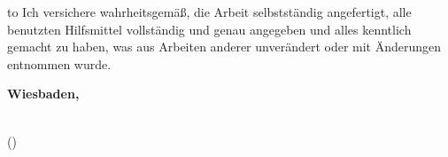 
\thispagestyle{empty}
\null\vfill
\noindent\hbox to \textwidth{\hrulefill} 
%
{Ich versichere wahrheitsgemäß, die Arbeit
selbstständig angefertigt, alle benutzten Hilfsmittel vollständig und genau
angegeben und alles kenntlich gemacht zu haben, was aus Arbeiten anderer
unverändert oder mit Änderungen entnommen wurde.}
 
 

\textbf{Wiesbaden, }
\vspace{1.5cm}
 
\dotfill\hspace*{8.0cm}\\
\hspace*{2cm}(\theauthor) 
\cleardoublepage